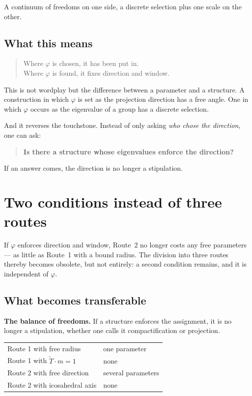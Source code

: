 \documentclass[11pt]{report}
\begin{document}
A continuum of freedoms on one side, a discrete selection plus one
scale on the other.

\section{What this means}

\begin{quote}
Where $\varphi$ is chosen, it has been put in.\\
Where $\varphi$ is found, it fixes direction and window.
\end{quote}

This is not wordplay but the difference between a parameter and a
structure. A construction in which $\varphi$ is set as the projection
direction has a free angle. One in which $\varphi$ occurs as the
eigenvalue of a group has a discrete selection.

And it reverses the touchstone. Instead of only asking \emph{who chose
the direction}, one can ask:

\begin{quote}
\textbf{Is there a structure whose eigenvalues enforce the direction?}
\end{quote}

If an answer comes, the direction is no longer a stipulation.

\chapter{Two conditions instead of three routes}

If $\varphi$ enforces direction and window, Route~2 no longer costs any
free parameters --- as little as Route~1 with a bound radius. The
division into three routes thereby becomes obsolete, but not entirely:
a second condition remains, and it is independent of $\varphi$.

\section{What becomes transferable}

\textbf{The balance of freedoms.} If a structure enforces the
assignment, it is no longer a stipulation, whether one calls it
compactification or projection.
\begin{center}
\begin{tabular}{ll}
Route 1 with free radius & one parameter \\
Route 1 with $\tilde T \cdot m = 1$ & none \\
Route 2 with free direction & several parameters \\
Route 2 with icosahedral axis & none \\
\end{tabular}
\end{center}
\end{document}

